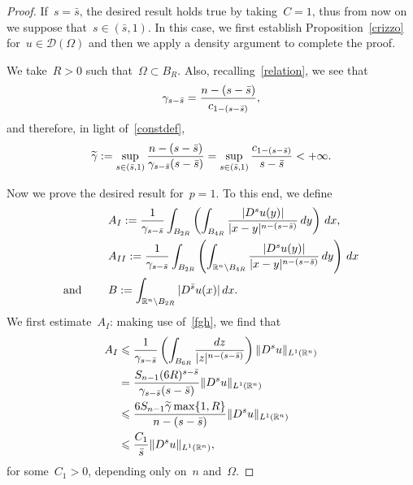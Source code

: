\documentclass[10pt,a4paper]{amsart}
\newcommand{\R}{\mathbb{R}}
\newcommand{\bs}{\Bar{s}}
\renewcommand{\le}{\leqslant}
\renewcommand{\leq}{\leqslant}
\begin{document}
		\begin{proof}
If~$s = \bar{s}$, the desired result holds true by taking~$C=1$, thus from now on
we suppose that~$s\in (\bar{s},1)$. 
In this case, we first establish Proposition~\ref{crizzo} for~$u \in \mathcal{D}(\Omega)$ and then we apply a density argument to complete the proof. 
						
			We take~$R>0$ such that~$\Omega \subset B_{R}$. Also, recalling~\eqref{relation}, we see that
			\[ \gamma_{s-\bs} = \frac{n-(s- \bs)}{c_{1-(s-\bs)}},\]
and therefore, in light of~\eqref{constdef},			
			\begin{equation}\label{fgh} \widetilde\gamma:= \sup_{ s \in (\bs,1)} \frac{n-(s- \bs)}{\gamma_{s-\bs}(s-\bs)} =
				\sup_{ s \in (\bs,1)} \frac{c_{1-(s-\bs)}}{s-\bs} < +\infty. 
				\end{equation}
					
	Now we prove the desired result for~$p=1$.
To this end, we define
	\begin{align*}
	 &A_I := \frac{1}{\gamma_{s-\bs}} \int_{B_{2R}} \left( \int_{B_{4R}} \frac{|D^su(y)|}{|x-y|^{n-(s-\bs)}} \, dy \right) \, dx, \\
	  &A_{II} := \frac{1}{\gamma_{s-\bs}} \int_{B_{2R}} \left( \int_{\R^n \setminus B_{4R}} \frac{|D^su(y)|}{|x-y|^{n-(s-\bs)}} \, dy \right) \, dx \\ {\mbox{and }}\qquad
	 &B := \int_{\R^n \setminus B_{2R}} |D^{\bar{s}} u (x)| \, dx.
	\end{align*}
	We first estimate~$A_I$: making use of~\eqref{fgh}, we find that 			
\begin{equation}\label{jeiwoytgrej768905}\begin{split}
A_I &\leq   \frac{1}{\gamma_{s-\bs}}  \left( \int_{B_{6R}} \frac{dz}{|z|^{n-(s-\bs)}} \right)\Vert D^s u \Vert_{L^1(\R^n)}\\&
= \frac{S_{n-1}(6R)^{s- \bar{s}}}{\gamma_{s-\bs}(s-\bar{s})} \Vert D^s u \Vert_{L^1(\R^n)}\\
&\le  \frac{6S_{n-1}\widetilde\gamma\max\{1,R\} }{n-(s-\bs)} \Vert D^s u \Vert_{L^1(\R^n)}\\&
\le  \frac{C_1 }{\bs} \Vert D^s u \Vert_{L^1(\R^n)},
\end{split}\end{equation} for some~$C_1>0$, depending only on~$n$ and~$\Omega$.


\end{proof}
\end{document}
